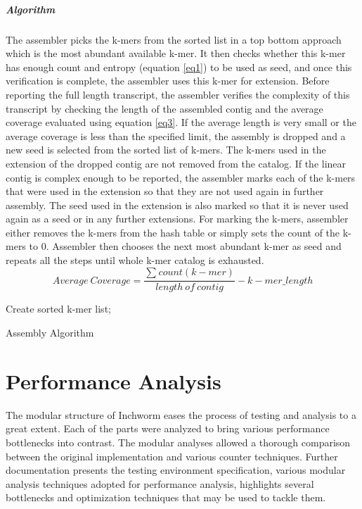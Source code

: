 \label{key}\documentclass[bachinf, english ,zihtitle,final,hyperref,utf8]{zihpub}
\begin{document}
\paragraph{Algorithm} The assembler picks the k-mers from the sorted list in a top bottom approach which is the most abundant available k-mer. It then checks whether this k-mer has enough count and entropy (equation \ref{eq1}) to be used as seed, and once this verification is complete, the assembler uses this k-mer for extension. Before reporting the full length transcript, the assembler verifies the complexity of this transcript by checking the length of the assembled contig and the average coverage evaluated using equation \ref{eq3}. If the average length is very small or the average coverage is less than the specified limit, the assembly is dropped and a new seed is selected from the sorted list of k-mers. The k-mers used in the extension of the dropped contig are not removed from the catalog. If the linear contig is complex enough to be reported, the assembler marks each of the k-mers that were used in the extension so that they are not used again in further assembly. The seed used in the extension is also marked so that it is never used again as a seed or in any further extensions. For marking the k-mers, assembler either removes the k-mers from the hash table or simply sets the count of the k-mers to 0. Assembler then chooses the next most abundant k-mer as seed and repeats all the steps until whole k-mer catalog is exhausted.
\begin{equation}
Average\ Coverage = \frac{\sum_{} count (k-mer)}{length\ of\ contig} - k-mer\_length
\label{eq3}
\end{equation}

\vspace{20pt}
 \begin{algorithm}[H]
 Create sorted k-mer list;\\
 \caption{Assembly Algorithm}
\end{algorithm}

\chapter{Performance Analysis}
The modular structure of Inchworm eases the process of testing and analysis to a great extent. Each of the parts were analyzed to bring various performance bottlenecks into contrast. The modular analyses allowed a thorough comparison between the original implementation and various counter techniques. Further documentation presents the testing environment specification, various modular analysis techniques adopted for performance analysis, highlights several bottlenecks and optimization techniques that may be used to tackle them. 
\end{document}

